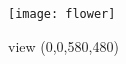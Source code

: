 \documentclass[a4paper,12pt]{report}
\begin{document}

\begin{figure}[htb]
\caption{view (0,0,580,480)}
\begin{center}
\texttt{[image: flower]}
\end{center}
\end{figure}
\clearpage
\end{document}
